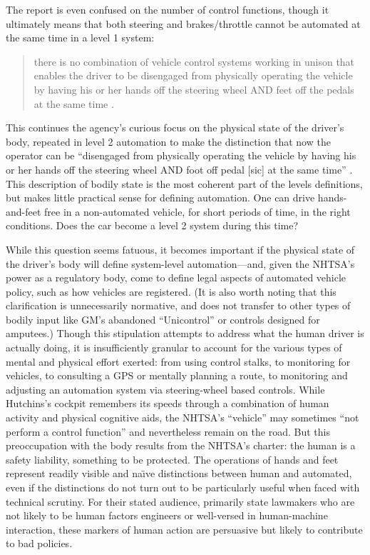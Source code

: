 The report is even confused on the number of control functions, though
it ultimately means that both steering and brakes/throttle cannot be
automated at the same time in a level 1 system: 
\begin{quote}
there is no combination of vehicle control systems working in unison
that enables the driver to be disengaged from physically operating the
vehicle by having his or her hands off the steering wheel AND feet off
the pedals at the same time \cite[p. 4]{NHTSA}.
\end{quote}
This continues the agency's curious focus on the physical state of the
driver's body, repeated in level 2 automation to make the distinction
that now the operator can be ``disengaged from physically operating the
vehicle by having his or her hands off the steering wheel AND foot off
pedal [sic] at the same time'' \cite[p. 5]{NHTSA}. This description of bodily state is
the most coherent part of the levels definitions, but makes little
practical sense for defining automation. One can drive hands-and-feet
free in a non-automated vehicle, for short periods of time, in the
right conditions. Does the car become a level 2 system during this time?


While this question seems fatuous, it becomes important if the
physical state of the driver's body will define system-level
automation---and, given the NHTSA's power as a regulatory body, come
to define legal aspects of automated vehicle policy, such as how
vehicles are registered. (It is also worth
noting that this clarification is
unnecessarily normative, and does not transfer to other types of
bodily input like GM's abandoned ``Unicontrol'' or controls designed
for amputees.) Though this stipulation attempts to address what the
human driver is actually doing, it is insufficiently granular to
account for the various types of mental and physical effort exerted:
from using control stalks, to monitoring for vehicles, to consulting a
GPS or mentally planning a route, to monitoring and adjusting an
automation system via steering-wheel based controls. While Hutchins's
cockpit remembers its speeds through a combination of 
human activity and physical cognitive aids, the NHTSA's ``vehicle''
may sometimes ``not perform a control function'' \cite[p. 3]{NHTSA} and
nevertheless remain on the road. But this
preoccupation with the body results from the NHTSA's charter: the
human is a safety liability, something to be protected. The operations
of hands and feet represent readily visible and na\"{\i}ve distinctions
between human and automated, even if the distinctions do not turn out
to be particularly useful when faced with technical scrutiny.
For their stated audience, primarily state lawmakers who are not
likely to be human factors engineers or well-versed in human-machine
interaction, these markers of human action are persuasive but likely
to contribute to bad policies.

